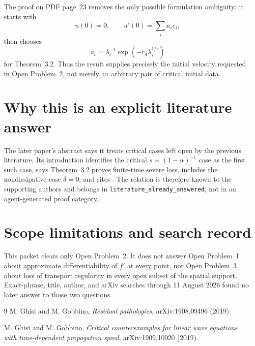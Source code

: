 \documentclass[11pt]{article}
\begin{document}
The proof on PDF page~23 removes the only possible formulation ambiguity: it
starts with
\[
 u(0)=0,
 \qquad
 u'(0)=\sum_i a_i e_i,
\]
then chooses
\[
 a_i=\lambda_i^{-1}\exp(-r_0\lambda_i^{1/s})
\]
for Theorem~3.2.  Thus the result supplies precisely the initial velocity
requested in Open Problem~2, not merely an arbitrary pair of critical initial
data.

\section*{Why this is an explicit literature answer}

The later paper's abstract says it treats critical cases left open by the
previous literature.  Its introduction identifies the critical
$s=(1-\alpha)^{-1}$ case as the first such case, says Theorem~3.2 proves
finite-time severe loss, includes the nondissipative case $\delta=0$, and
cites \cite{Residual}.  The relation is therefore known to the supporting
authors and belongs in \texttt{literature\_already\_answered}, not in an
agent-generated proof category.

\section*{Scope limitations and search record}

This packet clears only Open Problem~2.  It does not answer Open Problem~1
about approximate differentiability of $f'$ at every point, nor Open
Problem~3 about loss of transport regularity in every open subset of the
spatial support.  Exact-phrase, title, author, and arXiv searches through
11 August 2026 found no later answer to those two questions.

\begin{thebibliography}{9}
M. Ghisi and M. Gobbino,
\emph{Residual pathologies}, arXiv:1908.09496 (2019).

M. Ghisi and M. Gobbino,
\emph{Critical counterexamples for linear wave equations with time-dependent
propagation speed}, arXiv:1909.10020 (2019).
\end{thebibliography}
\end{document}
